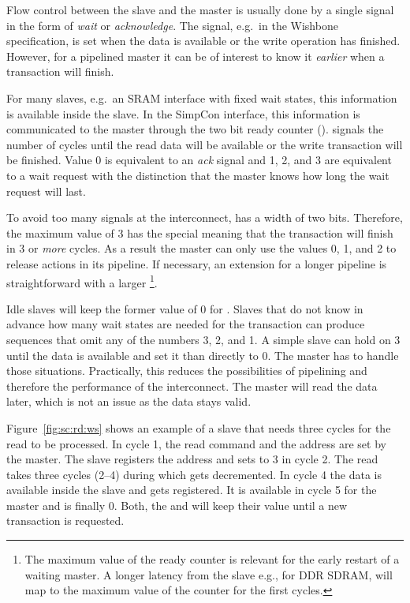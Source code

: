 Flow control between the slave and the master is usually done by a
single signal in the form of \emph{wait} or \emph{acknowledge}. The
 signal, e.g.\ in the Wishbone specification, is set when
the data is available or the write operation has finished. However,
for a pipelined master it can be of interest to know it
\emph{earlier} when a transaction will finish.


For many slaves, e.g.\ an SRAM interface with fixed wait states, this
information is available inside the slave. In the SimpCon interface,
this information is communicated to the master through the two bit
ready counter ().  signals the number
of cycles until the read data will be available or the write
transaction will be finished. Value 0 is equivalent to an \emph{ack}
signal and 1, 2, and 3 are equivalent to a wait request with the
distinction that the master knows how long the wait request will
last.

To avoid too many signals at the interconnect,  has a
width of two bits. Therefore, the maximum value of 3 has the special
meaning that the transaction will finish in 3 or \emph{more} cycles.
As a result the master can only use the values 0, 1, and 2 to release
actions in its pipeline. If necessary, an extension for a longer
pipeline is straightforward with a larger
\footnote{The maximum value of the ready counter is
relevant for the early restart of a waiting master. A longer latency
from the slave e.g., for DDR SDRAM, will map to the maximum value of
the counter for the first cycles.}.

Idle slaves will keep the former value of 0 for .
Slaves that do not know in advance how many wait states are needed
for the transaction can produce sequences that omit any of the
numbers 3, 2, and 1. A simple slave can hold  on 3
until the data is available and set it than directly to 0. The master
has to handle those situations. Practically, this reduces the
possibilities of pipelining and therefore the performance of the
interconnect. The master will read the data later, which is not an
issue as the data stays valid.

Figure~\ref{fig:sc:rd:ws} shows an example of a slave that needs
three cycles for the read to be processed. In cycle 1, the read
command and the address are set by the master. The slave registers
the address and sets  to 3 in cycle 2. The read takes
three cycles (2--4) during which  gets decremented. In
cycle 4 the data is available inside the slave and gets registered.
It is available in cycle 5 for the master and  is
finally 0. Both, the  and  will keep
their value until a new transaction is requested.

